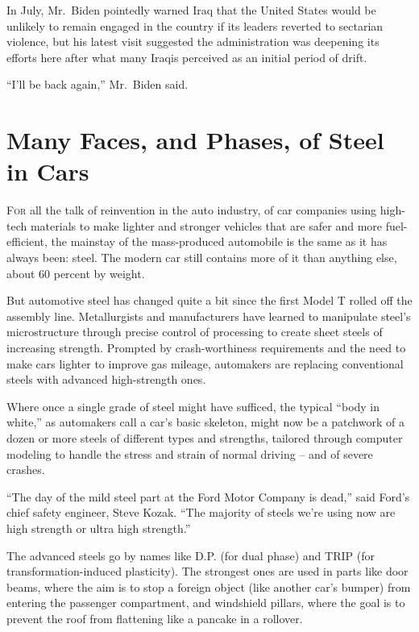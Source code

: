 ﻿\documentclass[12pt]{article}
\begin{document}
In July, Mr.~Biden pointedly warned Iraq that the United States would be unlikely to remain engaged
in the country if its leaders reverted to sectarian violence, but his latest visit suggested the
administration was deepening its efforts here after what many Iraqis perceived as an initial period
of drift.

``I'll be back again,'' Mr.~Biden said.

\section{Many Faces, and Phases, of Steel in Cars}

\lettrine{F}{or} all the talk of reinvention in the auto industry, of car companies using high-tech
materials to make lighter and stronger vehicles that are safer and more fuel-efficient, the mainstay
of the mass-produced automobile is the same as it has always been: steel. The modern car still
contains more of it than anything else, about 60 percent by weight.

But automotive steel has changed quite a bit since the first Model T rolled off the assembly line.
Metallurgists and manufacturers have learned to manipulate steel's microstructure through precise
control of processing to create sheet steels of increasing strength. Prompted by crash-worthiness
requirements and the need to make cars lighter to improve gas mileage, automakers are replacing
conventional steels with advanced high-strength ones.

Where once a single grade of steel might have sufficed, the typical ``body in white,'' as automakers
call a car's basic skeleton, might now be a patchwork of a dozen or more steels of different types
and strengths, tailored through computer modeling to handle the stress and strain of normal driving
-- and of severe crashes.

``The day of the mild steel part at the Ford Motor Company is dead,'' said Ford's chief safety
engineer, Steve Kozak. ``The majority of steels we're using now are high strength or ultra high
strength.''

The advanced steels go by names like D.P. (for dual phase) and TRIP (for transformation-induced
plasticity). The strongest ones are used in parts like door beams, where the aim is to stop a
foreign object (like another car's bumper) from entering the passenger compartment, and windshield
pillars, where the goal is to prevent the roof from flattening like a pancake in a rollover.
\end{document}
